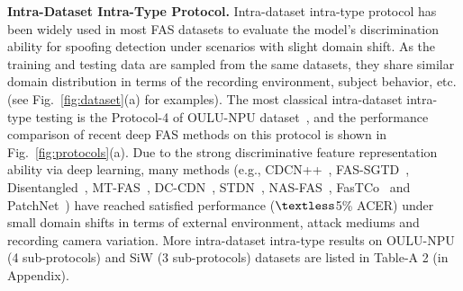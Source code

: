 \documentclass[10pt,journal,compsoc]{IEEEtran}
\begin{document}

\vspace{0.3em}

\noindent\textbf{Intra-Dataset Intra-Type Protocol.}\quad 
Intra-dataset intra-type protocol has been widely used in most FAS datasets to evaluate the model's discrimination ability for spoofing detection under scenarios with slight domain shift. As the training and testing data are sampled from the same datasets, they share similar domain distribution in terms of the recording environment, subject behavior, etc. (see Fig.~\ref{fig:dataset}(a) for examples). The most classical intra-dataset intra-type testing is the Protocol-4 of OULU-NPU dataset~\cite{Boulkenafet2017OULU}, and the performance comparison of recent deep FAS methods on this protocol is shown in Fig.~\ref{fig:protocols}(a). Due to the strong discriminative feature representation ability via deep learning, many methods (e.g., CDCN++~\cite{yu2020searching}, FAS-SGTD~\cite{wang2020deep}, Disentangled~\cite{zhang2020face}, MT-FAS~\cite{qin2021meta}, DC-CDN~\cite{yu2021dual}, STDN~\cite{liu2020disentangling}, NAS-FAS~\cite{yu2020fas2}, FasTCo~\cite{xu2020improving} and PatchNet~\cite{wang2022patchnet}) have reached satisfied performance ($\textless$5\% ACER) under small domain shifts in terms of external environment, attack mediums and recording camera variation. More intra-dataset intra-type results on OULU-NPU (4 sub-protocols) and SiW (3 sub-protocols) datasets are listed in Table-A 2 (in Appendix).  




\vspace{0.3em}
\end{document}
